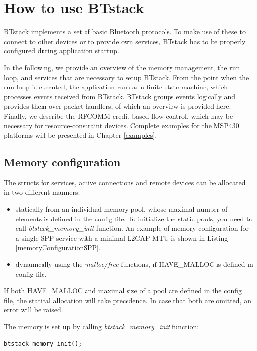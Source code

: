 \documentclass[a4paper,titlepage,oneside,12pt]{amsart} %
\begin{document}
\section{How to use BTstack}
BTstack implements a set of basic Bluetooth protocols. To make use of these to connect to other devices or to provide own services, BTstack has to be properly configured during application startup. 

In the following, we provide an overview of the memory management, the run loop, and services that are necessary to setup BTstack. From the point when the run loop is executed, the application runs as a finite state machine, which processes events received from BTstack. BTstack groups events logically and provides them over packet handlers, of which an overview is provided here. Finally, we describe the RFCOMM credit-based flow-control, which may be necessary for resource-constraint devices. Complete examples for the MSP430 platforms will be presented in Chapter \ref{examples}. 

\subsection{Memory configuration}
\label{section:memory_configuration}

The structs for services, active connections and remote devices can be allocated in two different manners: 
        \begin{itemize}
        \item statically from an individual memory pool, whose maximal number of elements  is defined in the config file. To initialize the static pools, you need to call \emph{btstack\_memory\_init} function. An example of memory configuration for a single SPP service with a minimal L2CAP MTU is shown in Listing \ref{memoryConfigurationSPP}.
        \item dynamically using the \emph{malloc/free} functions, if HAVE\_MALLOC is defined in config file. 
        \end{itemize}

If both HAVE\_MALLOC and  maximal size of a pool are defined in the config file, the statical allocation will take precedence. In case that both are omitted, an error will be raised.

The memory is set up by calling \emph{btstack\_memory\_init} function:
\begin{lstlisting}
btstack_memory_init();
\end{lstlisting}
\end{document}

